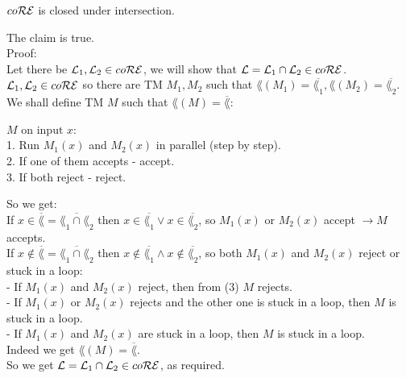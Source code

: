 $co\mathcal{R}\mathcal{E}$ is closed under intersection.

The claim is true. \\

Proof: \\
Let there be $\mathcal{L}_1, \mathcal{L}_2 \in co\mathcal{R}\mathcal{E}$, we will show that $\mathcal{L} = \mathcal{L}_1 \cap \mathcal{L}_2 \in co\mathcal{R}\mathcal{E}$. \\
$\mathcal{L}_1, \mathcal{L}_2 \in co\mathcal{R}\mathcal{E}$ so there are TM $M_1, M_2$ such that
$\lang(M_1) = \overline{\lang_1}, \lang(M_2) = \overline{\lang_2}$. \\
We shall define TM $M$ such that $\lang(M) = \overline{\lang}$:

$M \text{ on input } x$: \\
1. Run $M_1(x)$ and $M_2(x)$ in parallel (step by step). \\
2. If one of them accepts - accept. \\
3. If both reject - reject.

So we get: \\
If $x \in \overline{\lang} = \overline{\lang_1 \cap \lang_2}$ then
$x \in \overline{\lang_1} \vee x \in \overline{\lang_2}$, so $M_1(x)$ or $M_2(x)$ accept $\rightarrow M$ accepts. \\
If $x \notin \overline{\lang} = \overline{\lang_1 \cap \lang_2}$  then
$x \notin \overline{\lang_1} \wedge x \notin \overline{\lang_2}$, so both $M_1(x)$ and $M_2(x)$ reject or stuck in a loop: \\
- If $M_1(x)$ and $M_2(x)$ reject, then from (3) $M$ rejects. \\
- If $M_1(x)$ or $M_2(x)$ rejects and the other one is stuck in a loop, then  $M$ is stuck in a loop. \\
- If $M_1(x)$ and $M_2(x)$ are stuck in a loop, then  $M$ is stuck in a loop. \\

Indeed we get $\lang(M) = \overline{\lang}$. \\
So we get $\mathcal{L} = \mathcal{L}_1 \cap \mathcal{L}_2 \in co\mathcal{R}\mathcal{E}$, as required. \\

